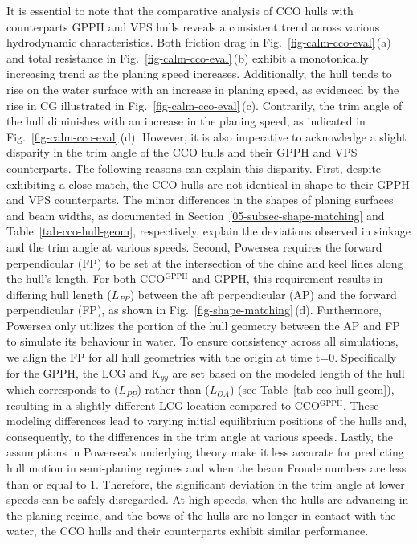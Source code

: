 It is essential to note that the comparative analysis of CCO hulls with counterparts GPPH and VPS hulls reveals a consistent trend across various hydrodynamic characteristics. Both friction drag in Fig.~\ref{fig-calm-cco-eval}\,(a) and total resistance in Fig.~\ref{fig-calm-cco-eval}\,(b) exhibit a monotonically increasing trend as the planing speed increases. Additionally, the hull tends to rise on the water surface with an increase in planing speed, as evidenced by the rise in CG illustrated in Fig.~\ref{fig-calm-cco-eval}\,(c). Contrarily, the trim angle of the hull diminishes with an increase in the planing speed, as indicated in Fig.~\ref{fig-calm-cco-eval}\,(d). However, it is also imperative to acknowledge a slight disparity in the trim angle of the CCO hulls and their GPPH and VPS counterparts. The following reasons can explain this disparity. First, despite exhibiting a close match, the CCO hulls are not identical in shape to their GPPH and VPS counterparts. The minor differences in the shapes of planing surfaces and beam widths, as documented in Section~\ref{05-subsec-shape-matching} and Table~\ref{tab-cco-hull-geom}, respectively, explain the deviations observed in sinkage and the trim angle at various speeds. Second, Powersea requires the forward perpendicular (FP) to be set at the intersection of the chine and keel lines along the hull's length. For both CCO\(^\textrm{GPPH}\) and GPPH, this requirement results in differing hull length (\(L_{PP}\)) between the aft perpendicular (AP) and the forward perpendicular (FP), as shown in Fig.~\ref{fig-shape-matching}\,(d). Furthermore, Powersea only utilizes the portion of the hull geometry between the AP and FP to simulate its behaviour in water. To ensure consistency across all simulations, we align the FP for all hull geometries with the origin at time t=0. Specifically for the GPPH, the LCG and K\(_{yy}\) are set based on the modeled length of the hull which corresponds to (\(L_{PP}\)) rather than (\(L_{OA}\)) (see Table~\ref{tab-cco-hull-geom}), resulting in a slightly different LCG location compared to CCO\(^\textrm{GPPH}\). These modeling differences lead to varying initial equilibrium positions of the hulls and, consequently, to the differences in the trim angle at various speeds. Lastly, the assumptions in Powersea's underlying theory make it less accurate for predicting hull motion in semi-planing regimes and when the beam Froude numbers are less than or equal to 1. Therefore, the significant deviation in the trim angle at lower speeds can be safely disregarded. At high speeds, when the hulls are advancing in the planing regime, and the bows of the hulls are no longer in contact with the water, the CCO hulls and their counterparts exhibit similar performance.

